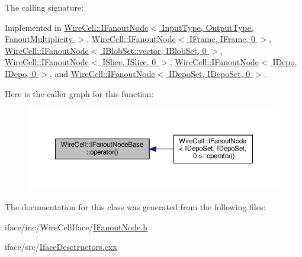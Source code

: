 The calling signature\+: 



Implemented in \hyperlink{class_wire_cell_1_1_i_fanout_node_a813e5346a910147df1d57d955c303129}{Wire\+Cell\+::\+I\+Fanout\+Node$<$ Input\+Type, Output\+Type, Fanout\+Multiplicity $>$}, \hyperlink{class_wire_cell_1_1_i_fanout_node_a813e5346a910147df1d57d955c303129}{Wire\+Cell\+::\+I\+Fanout\+Node$<$ I\+Frame, I\+Frame, 0 $>$}, \hyperlink{class_wire_cell_1_1_i_fanout_node_a813e5346a910147df1d57d955c303129}{Wire\+Cell\+::\+I\+Fanout\+Node$<$ I\+Blob\+Set\+::vector, I\+Blob\+Set, 0 $>$}, \hyperlink{class_wire_cell_1_1_i_fanout_node_a813e5346a910147df1d57d955c303129}{Wire\+Cell\+::\+I\+Fanout\+Node$<$ I\+Slice, I\+Slice, 0 $>$}, \hyperlink{class_wire_cell_1_1_i_fanout_node_a813e5346a910147df1d57d955c303129}{Wire\+Cell\+::\+I\+Fanout\+Node$<$ I\+Depo, I\+Depo, 0 $>$}, and \hyperlink{class_wire_cell_1_1_i_fanout_node_a813e5346a910147df1d57d955c303129}{Wire\+Cell\+::\+I\+Fanout\+Node$<$ I\+Depo\+Set, I\+Depo\+Set, 0 $>$}.

Here is the caller graph for this function\+:
\nopagebreak
\begin{figure}[H]
\begin{center}
\leavevmode
\includegraphics[width=350pt]{class_wire_cell_1_1_i_fanout_node_base_a2d8314d252381eaeb96c43f312eda8b7_icgraph}
\end{center}
\end{figure}


The documentation for this class was generated from the following files\+:\begin{DoxyCompactItemize}
\item 
iface/inc/\+Wire\+Cell\+Iface/\hyperlink{_i_fanout_node_8h}{I\+Fanout\+Node.\+h}\item 
iface/src/\hyperlink{_iface_desctructors_8cxx}{Iface\+Desctructors.\+cxx}\end{DoxyCompactItemize}
